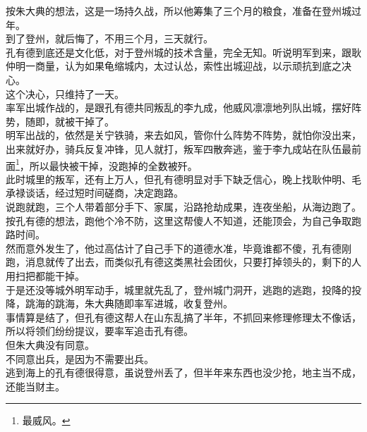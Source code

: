\begin{multicols}{\theparacolNo}
按朱大典的想法，这是一场持久战，所以他筹集了三个月的粮食，准备在登州城过年。\\

到了登州，就后悔了，不用三个月，三天就行。\\

孔有德到底还是文化低，对于登州城的技术含量，完全无知。听说明军到来，跟耿仲明一商量，认为如果龟缩城内，太过认怂，索性出城迎战，以示顽抗到底之决心。\\

这个决心，只维持了一天。\\

率军出城作战的，是跟孔有德共同叛乱的李九成，他威风凛凛地列队出城，摆好阵势，随即，就被干掉了。\\

明军出战的，依然是关宁铁骑，来去如风，管你什么阵势不阵势，就怕你没出来，出来就好办，骑兵反复冲锋，见人就打，叛军四散奔逃，鉴于李九成站在队伍最前面\footnote{最威风。}，所以最快被干掉，没跑掉的全数被歼。\\

此时城里的叛军，还有上万人，但孔有德明显对手下缺乏信心，晚上找耿仲明、毛承禄谈话，经过短时间磋商，决定跑路。\\

说跑就跑，三个人带着部分手下、家属，沿路抢劫成果，连夜坐船，从海边跑了。\\

按孔有德的想法，跑他个冷不防，这里这帮傻人不知道，还能顶会，为自己争取跑路时间。\\

然而意外发生了，他过高估计了自己手下的道德水准，毕竟谁都不傻，孔有德刚跑，消息就传了出去，而类似孔有德这类黑社会团伙，只要打掉领头的，剩下的人用扫把都能干掉。\\

于是还没等城外明军动手，城里就先乱了，登州城门洞开，逃跑的逃跑，投降的投降，跳海的跳海，朱大典随即率军进城，收复登州。\\

事情算是结了，但孔有德这帮人在山东乱搞了半年，不抓回来修理修理太不像话，所以将领们纷纷提议，要率军追击孔有德。\\

但朱大典没有同意。\\

不同意出兵，是因为不需要出兵。\\

逃到海上的孔有德很得意，虽说登州丢了，但半年来东西也没少抢，地主当不成，还能当财主。\\


\end{multicols}
